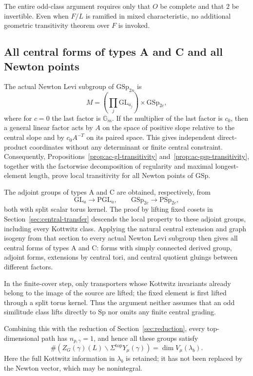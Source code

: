 \documentclass[11pt,a4paper]{article}
\theoremstyle{definition}
\theoremstyle{remark}
\begin{document}
The entire odd-class argument requires only that \(O\) be complete and
that \(2\) be invertible. Even when \(F/L\) is ramified in mixed
characteristic, no additional geometric transitivity theorem over
\(F\) is invoked.

\subsection{All central forms of types A and C and all Newton points}

The actual Newton Levi subgroup of \(\mathrm{GSp}_{2n}\) is
\[
M=\left(\prod_j\mathrm{GL}_{a_j}\right)\times\mathrm{GSp}_{2c},
\]
where for \(c=0\) the last factor is \(\mathbb G_m\). If the multiplier
of the last factor is \(c_0\), then a general linear factor acts by \(A\)
on the space of positive slope relative to the central slope and by
\(c_0A^{-T}\) on its paired space. This gives independent direct-product
coordinates without any determinant or finite central constraint.
Consequently, Propositions~\ref{prop:ac-gl-transitivity}
and~\ref{prop:ac-gsp-transitivity}, together with the factorwise
decomposition of regularity and maximal longest-element length, prove
local transitivity for all Newton points of \(\mathrm{GSp}\).

The adjoint groups of types A and C are obtained, respectively, from
\[
\mathrm{GL}_{a}\longrightarrow\mathrm{PGL}_{a},\qquad
\mathrm{GSp}_{2c}\longrightarrow\mathrm{PSp}_{2c},
\]
both with split scalar torus kernel. The proof by lifting fixed cosets
in Section~\ref{sec:central-transfer} descends the local property to
these adjoint groups, including every Kottwitz class. Applying the
natural central extension and graph isogeny from that section to every
actual Newton Levi subgroup then gives all central forms of types A and
C: forms with simply connected derived group, adjoint forms, extensions
by central tori, and central quotient gluings between different factors.

In the finite-cover step, only transporters whose Kottwitz invariants
already belong to the image of the source are lifted; the fixed element
is first lifted through a split torus kernel. Thus the argument neither
assumes that an odd similitude class lifts directly to \(\mathrm{Sp}\)
nor omits any finite central grading.

Combining this with the reduction of Section~\ref{sec:reduction}, every
top-dimensional path has \(n_{p,\gamma}=1\), and hence all these groups
satisfy
\[
\#\left(Z_G(\gamma)(L)\backslash
\Sigma^{\mathrm{top}}Y_\mu(\gamma)\right)
=\dim V_\mu(\lambda_b).
\]
Here the full Kottwitz information in \(\lambda_b\) is retained; it has
not been replaced by the Newton vector, which may be nonintegral.
\end{document}
